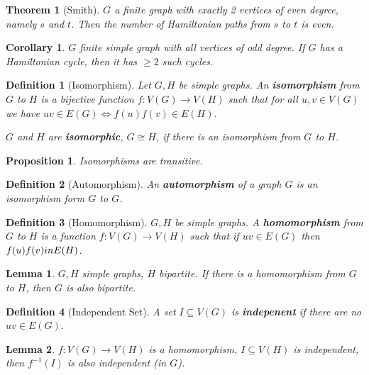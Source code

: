 \documentclass{article}
\newcommand{\st}{such that }
\newtheorem*{definition}{Definition}
\newtheorem*{proposition}{Proposition}
\newtheorem*{lemma}{Lemma}
\newtheorem*{theorem}{Theorem}
\newtheorem*{corollary}{Corollary}
\begin{document}
\begin{theorem}[Smith]
    $ G $ a finite graph with exactly 2 vertices of even degree, namely $ s $ and $ t $. Then the number of Hamiltonian paths from
    $ s $ to $ t $ is even.
\end{theorem}

\begin{corollary}
    $ G $ finite simple graph with all vertices of odd degree. If $ G $ has a Hamiltonian cycle, then it has $ \geq 2 $ such cycles.
\end{corollary}

\begin{definition}[Isomorphism]
    Let $ G, H $ be simple graphs. An \textbf{isomorphism} from $ G $ to $ H $ is a bijective function $ f: V(G) \to V(H) $ \st for all
    $ u,v \in V(G) $ we have $ uv \in E(G) \iff f(u)f(v) \in E(H) $.

    $ G $ and $ H $ are \textbf{isomorphic}, $ G \cong H $, if there is an isomorphism from $ G $ to $ H $.
\end{definition}

\begin{proposition}
    Isomorphisms are transitive.
\end{proposition}

\begin{definition}[Automorphism]
    An \textbf{automorphism} of a graph $ G $ is an isomorphism form $ G $ to $ G $.
\end{definition}

\begin{definition}[Homomorphism]
    $ G,H $ be simple graphs. A \textbf{homomorphism} from $ G $ to $ H $ is a function $ f: V(G) \to V(H) $ \st if
    $ uv \in E(G) $ then $ f(u)f(v) \\in E(H) $.
\end{definition}

\begin{lemma}
    $ G, H $ simple graphs, $ H $ bipartite. If there is a homomorphism from $ G  $ to $ H $, then $ G $ is also bipartite.
\end{lemma}

\begin{definition}[Independent Set]
    A set $ I \subseteq V(G) $ is \textbf{indepenent} if there are no $ uv \in E(G) $.
\end{definition}

\begin{lemma}
    $ f: V(G) \to V(H) $ is a homomorphism, $ I \subseteq V(H) $ is independent, then $ f^{-1}(I) $ is also independent (in $ G $).
\end{lemma}
\end{document}
